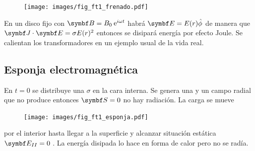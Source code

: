 \documentclass[10pt,oneside]{CBFT_book}
\begin{document}
\begin{figure}[htb]
	\begin{center}
	\texttt{[image: images/fig\_ft1\_frenado.pdf]}	 
	\end{center}
	\caption{}
\end{figure} 

En un disco fijo con $\vb{B} = B_0 \euler^{i\omega t}$  habrá $\vb{E} = E(r) \hat{\phi}$ de manera que 
$\pe{J}{E} = \sigma E(r)^2$ entonces se disipará energía por efecto Joule. Se calientan los 
transformadores en un ejemplo usual de la vida real.


\subsection{Esponja electromagnética}

En $t=0$ se distribuye una $\sigma$ en la cara interna. Se genera una  y un campo  radial que 
no produce  entonces $\vb{S}=0$ no hay radiación.
La carga se mueve 

\begin{figure}[htb]
	\begin{center}
	\texttt{[image: images/fig\_ft1\_esponja.pdf]}	 
	\end{center}
	\caption{}
\end{figure} 

por el interior hasta llegar a la superficie y alcanzar situación estática $\vb{E}_{II} = 0$ .
La energía disipada lo hace en forma de calor pero no se radía.

\end{document}
